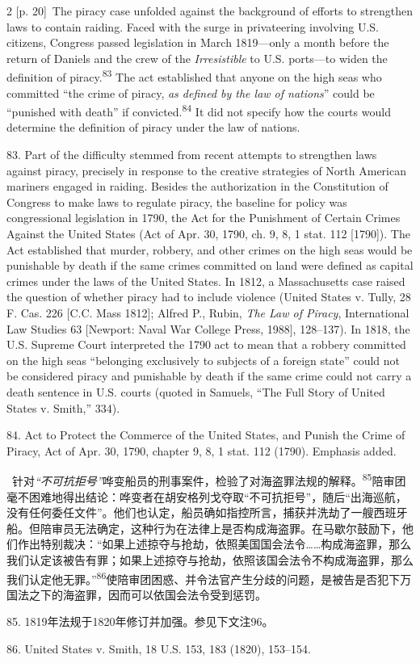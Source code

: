 \documentclass[10pt,a4paper]{article}
\begin{document}
\begin{paracol}{2}
{\scriptsize\color{gray} [p. 20]}\ The piracy case unfolded against the background of efforts to strengthen laws to contain raiding. Faced with the surge in privateering involving U.S. citizens, Congress passed legislation in March 1819—only a month before the return of Daniels and the crew of the \textit{Irresistible} to U.S. ports—to widen the definition of piracy.\nobreak\textsuperscript{83} The act established that anyone on the high seas who committed “the crime of piracy, \textit{as defined by the law of nations}” could be “punished with death” if convicted.\nobreak\textsuperscript{84} It did not specify how the courts would determine the definition of piracy under the law of nations.\par{\small 83. Part of the difficulty stemmed from recent attempts to strengthen laws against piracy, precisely in response to the creative strategies of North American mariners engaged in raiding. Besides the authorization in the Constitution of Congress to make laws to regulate piracy, the baseline for policy was congressional legislation in 1790, the Act for the Punishment of Certain Crimes Against the United States (Act of Apr. 30, 1790, ch. 9, 8, 1 stat. 112 [1790]). The Act established that murder, robbery, and other crimes on the high seas would be punishable by death if the same crimes committed on land were defined as capital crimes under the laws of the United States. In 1812, a Massachusetts case raised the question of whether piracy had to include violence (United States v. Tully, 28 F. Cas. 226 [C.C. Mass 1812]; Alfred P., Rubin, \textit{The Law of Piracy}, International Law Studies 63 [Newport: Naval War College Press, 1988], 128–137). In 1818, the U.S. Supreme Court interpreted the 1790 act to mean that a robbery committed on the high seas “belonging exclusively to subjects of a foreign state” could not be considered piracy and punishable by death if the same crime could not carry a death sentence in U.S. courts (quoted in Samuels, “The Full Story of United States v. Smith,” 334).\par}{\small 84. Act to Protect the Commerce of the United States, and Punish the Crime of Piracy, Act of Apr. 30, 1790, chapter 9, 8, 1 stat. 112 (1790). Emphasis added.\par}
\switchcolumn*
{\scriptsize\color{gray} [p. 20]}\ 针对\textit{“不可抗拒号”}哗变船员的刑事案件，检验了对海盗罪法规的解\mbox{释。\textsuperscript{85}}陪审团毫不困难地得出结论：哗变者在胡安格列戈夺取“不可抗拒号”，随后“出海巡航，没有任何委任文件”。他们也认定，船员确如指控所言，捕获并洗劫了一艘西班牙船。但陪审员无法确定，这种行为在法律上是否构成海盗罪。在马歇尔鼓励下，他们作出特别裁决：“如果上述掠夺与抢劫，依照美国国会法令……构成海盗罪，那么我们认定该被告有罪；如果上述掠夺与抢劫，依照该国会法令不构成海盗罪，那么我们认定他无罪。”\nobreak\textsuperscript{86}使陪审团困惑、并令法官产生分歧的问题，是被告是否犯下万国法之下的海盗罪，因而可以依国会法令受到惩罚。\par{\small 85. 1819年法规于1820年修订并加强。参见下文注96。\par}{\small 86. United States v. Smith, 18 U.S. 153, 183 (1820), 153–154.\par}

\end{paracol}
\end{document}
